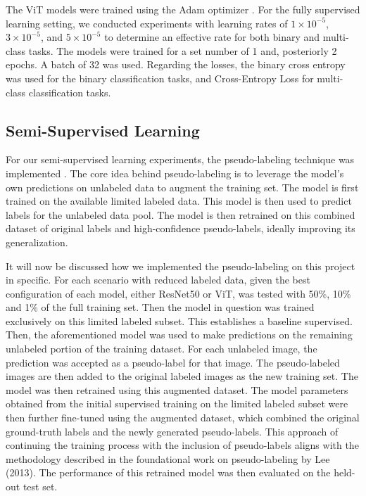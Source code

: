 \documentclass{article}
\begin{document}
The ViT models were trained using the Adam optimizer \citep{kingma2014adam}. For the fully supervised learning setting, we conducted experiments with learning rates of $1 \times 10^{-5}$, $3 \times 10^{-5}$, and $5 \times 10^{-5}$ to determine an effective rate for both binary and multi-class tasks. The models were trained for a set number of 1 and, posteriorly 2 epochs. A batch of 32 was used. Regarding the losses, the binary cross entropy was used for the binary classification tasks, and Cross-Entropy Loss for multi-class classification tasks. 

\subsection{Semi-Supervised Learning}
For our semi-supervised learning experiments, the pseudo-labeling technique was implemented \cite{lee2013pseudo}. The core idea behind  pseudo-labeling is to leverage the model's own predictions on unlabeled data to augment the training set. The model is first trained on the available limited labeled data. This model is then used to predict labels for the unlabeled data pool. The model is then retrained on this combined dataset of original labels and high-confidence pseudo-labels, ideally improving its generalization. 

It will now be discussed how we implemented the pseudo-labeling on this project in specific. For each scenario with reduced labeled data, given the best configuration of each model, either ResNet50 or ViT, was tested with 50\%, 10\% and 1\% of the full training set. Then the model in question was trained exclusively on this limited labeled subset. This establishes a baseline supervised. Then, the aforementioned model was used to make predictions on the remaining unlabeled portion of the training dataset. For each unlabeled image, the prediction was accepted as a pseudo-label for that image. The pseudo-labeled images are then added to the original labeled images as the new training set. The model was then retrained using this augmented dataset. The model parameters obtained from the initial supervised training on the limited labeled subset were then further fine-tuned using the augmented dataset, which combined the original ground-truth labels and the newly generated pseudo-labels. This approach of continuing the training process with the inclusion of pseudo-labels aligns with the methodology described in the foundational work on pseudo-labeling by Lee (2013)\cite{lee2013pseudo}. The performance of this retrained model was then evaluated on the held-out test set.  
\end{document}
